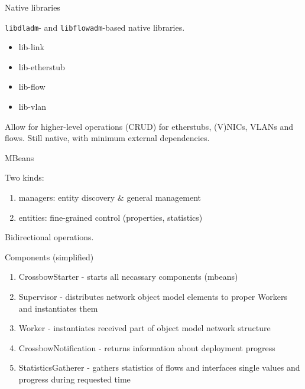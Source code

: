 \documentclass{beamer}
\begin{document}
	\begin{frame}{Native libraries}

		\texttt{libdladm}- and \texttt{libflowadm}-based native libraries.

		\begin{itemize}
			\item lib-link
			\item lib-etherstub
			\item lib-flow
			\item lib-vlan
		\end{itemize}

		Allow for higher-level operations (CRUD) for etherstubs, (V)NICs, VLANs and flows. Still native, with minimum external dependencies.
	
	\end{frame}


	\begin{frame}{MBeans}

		Two kinds:
		
		\begin{enumerate}
			\item managers: entity discovery \& general management
			\item entities: fine-grained control (properties, statistics)
		\end{enumerate}

		Bidirectional operations.
	
	\end{frame}


	\begin{frame}{Components (simplified)}

		\begin{enumerate}
			\item CrossbowStarter - starts all necassary components (mbeans)
			\item Supervisor - distributes network object model elements to proper Workers and instantiates them
			\item Worker - instantiates received part of object model network structure
			\item CrossbowNotification - returns information about deployment progress
			\item StatisticsGatherer - gathers statistics of flows and interfaces single values and progress during requested time
		\end{enumerate}
	
	\end{frame}
\end{document}
